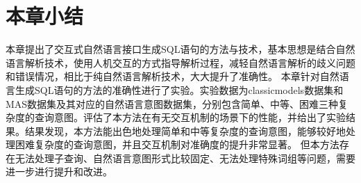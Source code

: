 \section{本章小结}
本章提出了交互式自然语言接口生成SQL语句的方法与技术，基本思想是结合自然语言解析技术，使用人机交互的方式指导解析过程，减轻自然语言解析的歧义问题和错误情况，相比于纯自然语言解析技术，大大提升了准确性。
本章针对自然语言生成SQL语句的方法的准确性进行了实验。实验数据为classicmodels数据集和MAS数据集及其对应的自然语言意图数据集，分别包含简单、中等、困难三种复杂度的查询意图。评估了本方法在有无交互机制的场景下的性能，并给出了实验结果。结果发现，本方法能出色地处理简单和中等复杂度的查询意图，能够较好地处理困难复杂度的查询意图，并且交互机制对准确度的提升非常显著。
但本方法存在无法处理子查询、自然语言意图形式比较固定、无法处理特殊词组等问题，需要进一步进行提升和改进。




